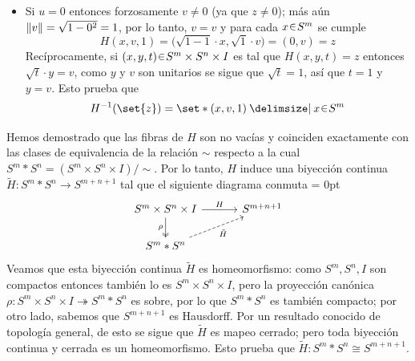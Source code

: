 \begin{sol}[Demostración]
\begin{itemize}
    \item Si $u = 0$ entonces forzosamente $v \neq 0$ (ya que $z \neq 0$); más aún $\norm{v} = \sqrt{1-0^2} = 1$, por lo tanto, $v = \hat{v}$ y para cada $x \en S^m$ se cumple
    \[
    H(x, v, 1)%
    = \big(\sqrt{1-1} \cdot x,\sqrt{1} \cdot v\big)%
    = (0,v) = z
    \]
    Recíprocamente, si $(x,y,t) \en S^m \times S^n \times I$ es tal que $H(x,y,t) = z$ entonces $\sqrt{t} \cdot y = v$, como $y$ y $v$ son unitarios se sigue que $\sqrt{t} = 1$, así que $t=1$ y $y = v$. Esto prueba que
    \[
    H^{-1}(\set{z}) = \set*{(x,v,1) \given x \en S^m}
    \]
\end{itemize}
Hemos demostrado que las fibras de $H$ son no vacías y coinciden exactamente con las clases de equivalencia de la relación $\sim$ respecto a la cual $S^m * S^n = (S^m \times S^n \times I)/\sim$. Por lo tanto, $H$ induce una biyección continua $\tilde{H} \colon S^m * S^n \to S^{m+n+1}$ tal que el siguiente diagrama conmuta
{\mathsurround = 0pt
\[\begin{tikzcd}[column sep = 1.6em]
	{S^m \times S^n \times I} && {S^{m+n+1}} \\
	{S^m * S^n}
	\arrow["H", from=1-1, to=1-3]
	\arrow["\rho"', two heads, from=1-1, to=2-1]
	\arrow["{\tilde{H}}"', dashed, from=2-1, to=1-3]
\end{tikzcd}\]
}
Veamos que esta biyección continua $\tilde{H}$ es homeomorfismo: como $S^m,S^n,I$ son compactos entonces también lo es $S^m \times S^n \times I$, pero la proyección canónica $\rho\colon S^m \times S^n \times I \twoheadrightarrow S^m * S^n$ es sobre, por lo que $S^m * S^n$ es también compacto; por otro lado, sabemos que $S^{m+n+1}$ es Hausdorff. Por un resultado conocido de topología general, de esto se sigue que $\tilde{H}$ es mapeo cerrado; pero toda biyección continua y cerrada es un homeomorfismo. Esto prueba que $\tilde{H} \colon S^m * S^n \cong S^{m+n+1}$.
\end{sol}

